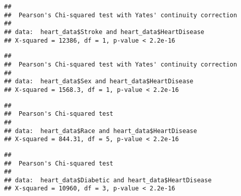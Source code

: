 \documentclass[
]{article}
\newenvironment{Shaded}{\begin{snugshade}}{\end{snugshade}}
\newcommand{\FunctionTok}[1]{\textcolor[rgb]{0.00,0.00,0.00}{#1}}
\newcommand{\NormalTok}[1]{#1}
\newcommand{\SpecialCharTok}[1]{\textcolor[rgb]{0.00,0.00,0.00}{#1}}
\begin{document}
\begin{Shaded}
\end{Shaded}

\begin{verbatim}
## 
##  Pearson's Chi-squared test with Yates' continuity correction
## 
## data:  heart_data$Stroke and heart_data$HeartDisease
## X-squared = 12386, df = 1, p-value < 2.2e-16
\end{verbatim}

\begin{Shaded}
\end{Shaded}

\begin{verbatim}
## 
##  Pearson's Chi-squared test with Yates' continuity correction
## 
## data:  heart_data$Sex and heart_data$HeartDisease
## X-squared = 1568.3, df = 1, p-value < 2.2e-16
\end{verbatim}

\begin{Shaded}
\end{Shaded}

\begin{verbatim}
## 
##  Pearson's Chi-squared test
## 
## data:  heart_data$Race and heart_data$HeartDisease
## X-squared = 844.31, df = 5, p-value < 2.2e-16
\end{verbatim}

\begin{Shaded}
\end{Shaded}

\begin{verbatim}
## 
##  Pearson's Chi-squared test
## 
## data:  heart_data$Diabetic and heart_data$HeartDisease
## X-squared = 10960, df = 3, p-value < 2.2e-16
\end{verbatim}
\end{document}
